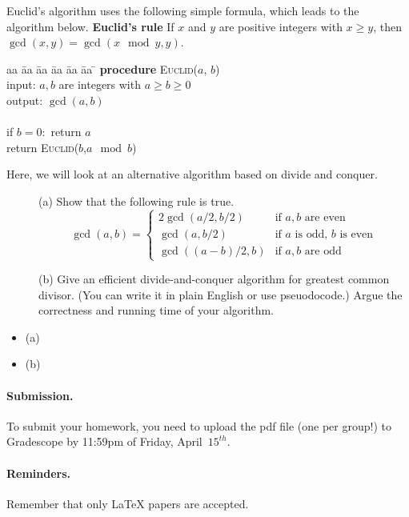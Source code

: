 \documentclass{article}
\begin{document}
\begin{problem} %
Euclid's algorithm uses the following simple formula, which leads to the algorithm below. 
\vskip 0.2in
\noindent \textbf{Euclid's rule} If $x$ and $y$ are positive integers with $x \ge y$, then $\gcd(x,y) = \gcd(x \mod y,y)$.

\begin{tabbing}
aa \= aa \= aa \= aa \= aa \= aa \= \kill
\textbf{procedure} \textsc{Euclid}($a$, $b$) \\
input: $a,b$ are integers with $a \ge b \ge 0$\\
output: $\gcd(a, b)$\\\\
if $b=0:$ return $a$\\
return \textsc{Euclid}($b$,$a \mod b$)
\end{tabbing}
Here, we will look at an alternative algorithm based on divide and conquer.
\begin{description}
\item[]{(a)} Show that the following rule is true. 
$$\gcd(a, b) = \begin{cases}
2\gcd(a/2,b/2) & \text{if $a,b$ are even} \\
\gcd(a,b/2) & \text{if $a$ is odd, $b$ is even} \\
\gcd((a-b)/2,b) & \text{if $a,b$ are odd}
\end{cases}$$
\item[]{(b)} Give an efficient divide-and-conquer algorithm for greatest common divisor. (You can write it in plain English or use pseuodocode.) Argue the correctness and running time of your algorithm.
\end{description}
\end{problem}

\begin{solution}
\begin{itemize}
	\item[]{(a)}
	\item[]{(b)}
\end{itemize}
\end{solution}


\paragraph{Submission.}
To submit your homework, you need to upload the pdf file (one per group!) to Gradescope by 11:59pm of Friday, April~$15^{th}$. 

\paragraph{Reminders.}
Remember that only {\LaTeX} papers are accepted. 
\end{document}
